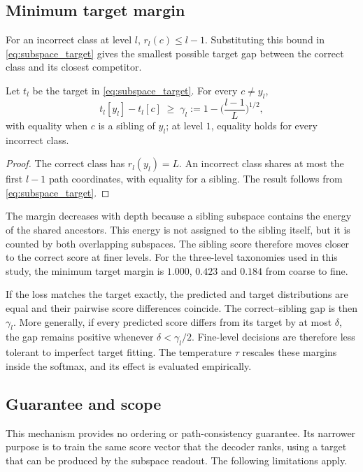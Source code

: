 \subsection{Minimum target margin}
\label{ssec:subspace_margin}

For an incorrect class at level $l$, $r_l(c)\leq l-1$. Substituting this bound
in \eqref{eq:subspace_target} gives the smallest possible target gap between the
correct class and its closest competitor.

\begin{proposition}
\label{prop:subspace_margin}
Let $t_l$ be the target in \eqref{eq:subspace_target}. For every
$c\neq y_l$,
\[
t_l[y_l]-t_l[c]\;\ge\;\gamma_l:=1-\Big(\frac{l-1}{L}\Big)^{1/2},
\]
with equality when $c$ is a sibling of $y_l$; at level $1$, equality holds for
every incorrect class.
\end{proposition}

\begin{proof}
The correct class has $r_l(y_l)=L$. An incorrect class shares at most the first
$l-1$ path coordinates, with equality for a sibling. The result follows from
\eqref{eq:subspace_target}.
\end{proof}

The margin decreases with depth because a sibling subspace contains the energy
of the shared ancestors. This energy is not assigned to the sibling itself, but
it is counted by both overlapping subspaces. The sibling score therefore moves
closer to the correct score at finer levels. For the three-level taxonomies used
in this study, the minimum target margin is $1.000$, $0.423$ and $0.184$ from
coarse to fine.

If the loss matches the target exactly, the predicted and target distributions
are equal and their pairwise score differences coincide. The correct--sibling
gap is then $\gamma_l$. More generally, if every predicted score differs from
its target by at most $\delta$, the gap remains positive whenever
$\delta<\gamma_l/2$. Fine-level decisions are therefore less tolerant to
imperfect target fitting. The temperature $\tau$
rescales these margins inside the softmax, and its effect is evaluated
empirically.

\subsection{Guarantee and scope}
This mechanism provides no ordering or path-consistency guarantee. Its narrower
purpose is to train the same score vector that the decoder ranks, using a target
that can be produced by the subspace readout. The following limitations apply.

